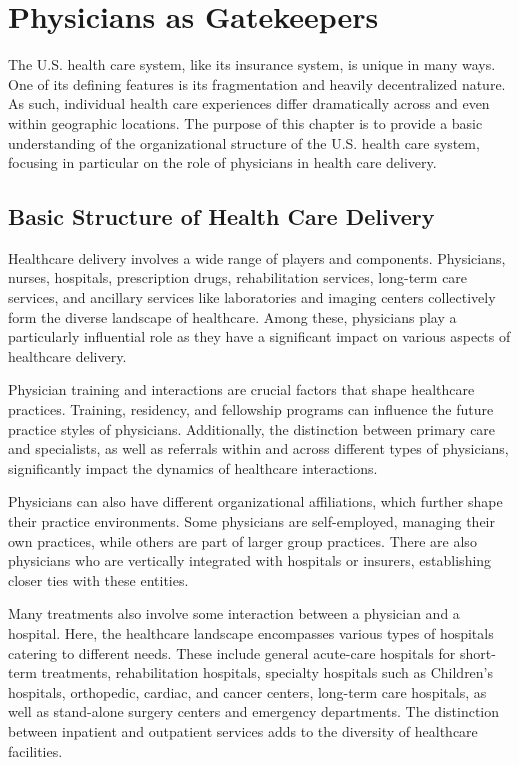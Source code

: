 \documentclass[
  letterpaper,
  DIV=11,
  numbers=noendperiod]{scrreport}
\theoremstyle{definition}
\theoremstyle{remark}
\begin{document}
\hypertarget{physicians-as-gatekeepers}{%
\chapter{Physicians as Gatekeepers}\label{physicians-as-gatekeepers}}

The U.S. health care system, like its insurance system, is unique in
many ways. One of its defining features is its fragmentation and heavily
decentralized nature. As such, individual health care experiences differ
dramatically across and even within geographic locations. The purpose of
this chapter is to provide a basic understanding of the organizational
structure of the U.S. health care system, focusing in particular on the
role of physicians in health care delivery.

\hypertarget{basic-structure-of-health-care-delivery}{%
\section{Basic Structure of Health Care
Delivery}\label{basic-structure-of-health-care-delivery}}

Healthcare delivery involves a wide range of players and components.
Physicians, nurses, hospitals, prescription drugs, rehabilitation
services, long-term care services, and ancillary services like
laboratories and imaging centers collectively form the diverse landscape
of healthcare. Among these, physicians play a particularly influential
role as they have a significant impact on various aspects of healthcare
delivery.

Physician training and interactions are crucial factors that shape
healthcare practices. Training, residency, and fellowship programs can
influence the future practice styles of physicians. Additionally, the
distinction between primary care and specialists, as well as referrals
within and across different types of physicians, significantly impact
the dynamics of healthcare interactions.

Physicians can also have different organizational affiliations, which
further shape their practice environments. Some physicians are
self-employed, managing their own practices, while others are part of
larger group practices. There are also physicians who are vertically
integrated with hospitals or insurers, establishing closer ties with
these entities.

Many treatments also involve some interaction between a physician and a
hospital. Here, the healthcare landscape encompasses various types of
hospitals catering to different needs. These include general acute-care
hospitals for short-term treatments, rehabilitation hospitals, specialty
hospitals such as Children's hospitals, orthopedic, cardiac, and cancer
centers, long-term care hospitals, as well as stand-alone surgery
centers and emergency departments. The distinction between inpatient and
outpatient services adds to the diversity of healthcare facilities.
\end{document}
